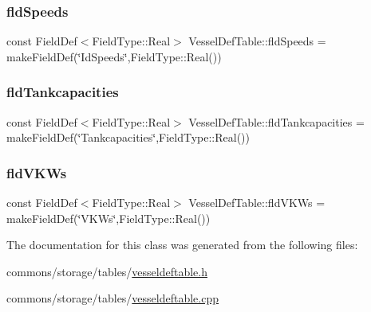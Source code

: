 \mbox{\label{class_vessel_def_table_a34714bb93169ad9f570b1f8cb7a68b3d}} 
\subsubsection{\texorpdfstring{fldSpeeds}{fldSpeeds}}
{\footnotesize\ttfamily const Field\+Def$<$Field\+Type\+::\+Real$>$ Vessel\+Def\+Table\+::fld\+Speeds = make\+Field\+Def(\char`\"{}Id\+Speeds\char`\"{},Field\+Type\+::\+Real())}

\mbox{\label{class_vessel_def_table_aa699fd40e4fb67ca89350cd34c77fe4b}} 
\subsubsection{\texorpdfstring{fldTankcapacities}{fldTankcapacities}}
{\footnotesize\ttfamily const Field\+Def$<$Field\+Type\+::\+Real$>$ Vessel\+Def\+Table\+::fld\+Tankcapacities = make\+Field\+Def(\char`\"{}Tankcapacities\char`\"{},Field\+Type\+::\+Real())}

\mbox{\label{class_vessel_def_table_a196a7ed569bb463dc08a442facfae121}} 
\subsubsection{\texorpdfstring{fldVKWs}{fldVKWs}}
{\footnotesize\ttfamily const Field\+Def$<$Field\+Type\+::\+Real$>$ Vessel\+Def\+Table\+::fld\+V\+K\+Ws = make\+Field\+Def(\char`\"{}V\+K\+Ws\char`\"{},Field\+Type\+::\+Real())}



The documentation for this class was generated from the following files\+:\begin{DoxyCompactItemize}
\item 
commons/storage/tables/\mbox{\hyperlink{vesseldeftable_8h}{vesseldeftable.\+h}}\item 
commons/storage/tables/\mbox{\hyperlink{vesseldeftable_8cpp}{vesseldeftable.\+cpp}}\end{DoxyCompactItemize}
